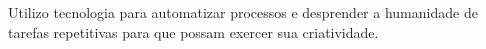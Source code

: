 

Utilizo tecnologia para automatizar processos e desprender a humanidade de tarefas repetitivas para que possam exercer sua criatividade.

